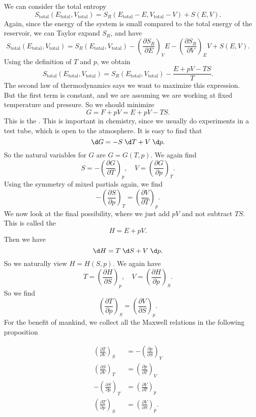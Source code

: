 \documentclass[a4paper]{article}
\begin{document}
We can consider the total entropy
\[
  S_{\mathrm{total}}(E_{\mathrm{total}}, V_{\mathrm{total}}) = S_R(E_{\mathrm{total}} - E, V_{\mathrm{total}} - V) + S(E, V).
\]
Again, since the energy of the system is small compared to the total energy of the reservoir, we can Taylor expand $S_R$, and have
\[
  S_{\mathrm{total}}(E_{\mathrm{total}}, V_{\mathrm{total}}) = S_R(E_{\mathrm{total}}, V_{\mathrm{total}}) - \left(\frac{\partial S_R}{\partial E}\right)_V E - \left(\frac{\partial S_R}{\partial V}\right)_E V + S(E, V).
\]
Using the definition of $T$ and $p$, we obtain
\[
  S_{\mathrm{total}}(E_{\mathrm{total}}, V_{\mathrm{total}}) = S_R(E_{\mathrm{total}}, V_{\mathrm{total}}) - \frac{E + pV - TS}{T}.
\]
The second law of thermodynamics says we want to maximize this expression. But the first term is constant, and we are assuming we are working at fixed temperature and pressure. So we should minimize
\[
  G = F + pV = E + pV - TS.
\]
This is the . This is important in chemistry, since we usually do experiments in a test tube, which is open to the atmosphere. It is easy to find that
\[
  \d G = - S \;\d T + V \;\d p.
\]
So the natural variables for $G$ are $G = G(T, p)$. We again find
\[
  S = -\left(\frac{\partial G}{\partial T}\right)_p,\quad V = \left(\frac{\partial G}{\partial p}\right)_T.
\]
Using the symmetry of mixed partials again, we find
\[
  - \left(\frac{\partial S}{\partial p}\right)_T = \left(\frac{\partial V}{\partial T}\right)_p.
\]
We now look at the final possibility, where we just add $pV$ and not subtract $TS$. This is called the 
\[
  H = E + pV.
\]
Then we have
\[
  \d H = T\;\d S + V \;\d p.
\]
So we naturally view $H = H(S, p)$. We again have
\[
  T = \left(\frac{\partial H}{\partial S}\right)_p,\quad V = \left(\frac{\partial H}{\partial p}\right)_S.
\]
So we find
\[
  \left(\frac{\partial T}{\partial p}\right)_S = \left(\frac{\partial V}{\partial S}\right)_p.
\]
For the benefit of mankind, we collect all the Maxwell relations in the following proposition
\begin{prop}
  \begin{align*}
    \left(\frac{\partial T}{\partial V}\right)_S &= - \left(\frac{\partial p}{\partial S}\right)_V\\
    \left(\frac{\partial S}{\partial V}\right)_T &= \left(\frac{\partial p}{\partial T}\right)_V\\
    - \left(\frac{\partial S}{\partial p}\right)_T &= \left(\frac{\partial V}{\partial T}\right)_p\\
    \left(\frac{\partial T}{\partial p}\right)_S &= \left(\frac{\partial V}{\partial S}\right)_p.
  \end{align*}
\end{prop}
\end{document}
